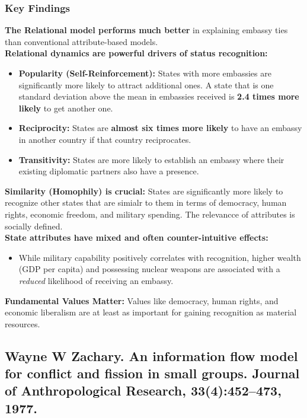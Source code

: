 \documentclass{article}
\begin{document}
    \subsubsection{Key Findings}
    \noindent \textbf{The Relational model performs much better} in
explaining embassy ties than conventional attribute-based models.\\

    \noindent
\textbf{Relational dynamics are powerful drivers of status recognition:}
    \begin{itemize}
        \item \textbf{Popularity (Self-Reinforcement):} States with more
        embassies are significantly more likely to attract additional ones.
        A state that is one standard deviation above the mean in embassies
        received is \textbf{2.4 times more likely} to get another one.
        \item \textbf{Reciprocity:} States are
        \textbf{almost six times more likely} to have an embassy in another
        country if that country reciprocates.
        \item \textbf{Transitivity:} States are more likely to establish an
        embassy where their existing diplomatic partners also have a presence.
    \end{itemize}

    \noindent \textbf{Similarity (Homophily) is crucial:} States are
significantly more likely to recognize other states that are simialr to them
in terms of democracy, human rights, economic freedom, and military
spending. The relevancce of attributes is socially defined.\\

    \noindent
\textbf{State attributes have mixed and often counter-intuitive effects:}
    \begin{itemize}
        \item While military capability positively correlates with
        recognition, higher wealth (GDP per capita) and possessing nuclear
        weapons are associated with a \textit{reduced} likelihood of
        receiving an embassy.
    \end{itemize}

    \noindent \textbf{Fundamental Values Matter:} Values like democracy,
human rights, and economic liberalism are at least as important for gaining
recognition as material resources.

    \subsection{Wayne W Zachary. An information flow model for conflict and fission in small groups. Journal of Anthropological Research, 33(4):452–473, 1977.}
\end{document}
